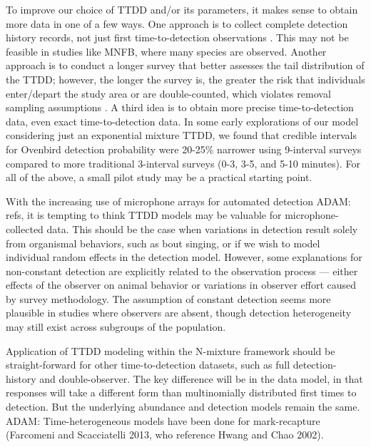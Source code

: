 \documentclass[useAMS,usenatbib,referee,12pt]{article}
\newcommand{\adam}[1]{{\color{blue} ADAM: #1}}
\begin{document}


To improve our choice of TTDD and/or its parameters, it makes sense to obtain more data in one of a few ways.  
One approach is to collect complete detection history records, not just first time-to-detection observations \citep{Alldredge2007}.  
This may not be feasible in studies like MNFB, where many species are observed.  
Another approach is to conduct a longer survey that better assesses the tail distribution of the TTDD; however, the longer the survey is, the greater the risk that individuals enter/depart the study area or are double-counted, which violates removal sampling assumptions \citep{LeeMarsden2008, Reidy2011}.  
A third idea is to obtain more precise time-to-detection data, even exact time-to-detection data.  
In some early explorations of our model considering just an exponential mixture TTDD, we found that credible intervals for Ovenbird detection probability were 20-25\% narrower using 9-interval surveys compared to more traditional 3-interval surveys (0-3, 3-5, and 5-10 minutes).  
For all of the above, a small pilot study may be a practical starting point.  


With the increasing use of microphone arrays for automated detection \adam{refs}, it is tempting to think TTDD models may be valuable for microphone-collected data.  
This should be the case when variations in detection result solely from organismal behaviors, such as bout singing, or if we wish to model individual random effects in the detection model.  
However, some explanations for non-constant detection are explicitly related to the observation process --- either effects of the observer on animal behavior or variations in observer effort caused by survey methodology.  
The assumption of constant detection seems more plausible in studies where observers are absent, though detection heterogeneity may still exist across subgroups of the population.

Application of TTDD modeling within the N-mixture framework should be straight-forward for other time-to-detection datasets, such as full detection-history and double-observer.  
The key difference will be in the data model, in that responses will take a different form than multinomially distributed first times to detection.  
But the underlying abundance and detection models remain the same.  
\adam{Time-heterogeneous models have been done for mark-recapture (Farcomeni and Scacciatelli 2013, who reference Hwang and Chao 2002).}
\end{document}
